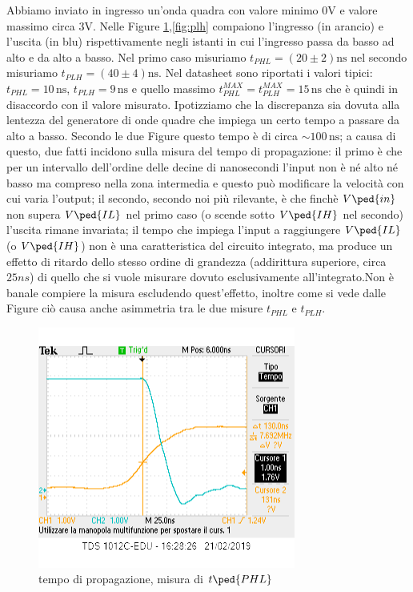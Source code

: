 \documentclass[10pt,a4paper]{article}
\begin{document}
Abbiamo inviato in ingresso un'onda quadra con valore minimo $0 \si{\volt}$  e valore massimo circa $3 \si{\volt}$. Nelle Figure \ref{fig:phl},\ref{fig:plh}  compaiono l'ingresso (in arancio) e l'uscita (in blu) rispettivamente negli istanti in cui l'ingresso passa da basso ad alto e da alto a basso.
Nel primo caso misuriamo $t_{PHL}= (20\pm 2 )\si{\nano\second}$ nel secondo  misuriamo $t_{PLH} = (40\pm 4)\si{\nano \second}$.
Nel datasheet sono riportati i valori tipici: $t_{PHL}= 10 \,\si{\nano\second}$, $t_{PLH} = 9\,\si{\nano \second}$ e quello massimo $t_{PHL}^{MAX}= t_{PLH}^{MAX}= 15\, \si{\nano\second}$ che è quindi in disaccordo con il valore misurato. Ipotizziamo  che la discrepanza sia dovuta alla lentezza del generatore di onde quadre che impiega un certo tempo a passare da alto a basso.
Secondo le due Figure questo tempo è di circa $\sim 100 \, \si {\nano\second}$; a causa di questo, due fatti incidono sulla misura del tempo di propagazione: il primo è che per un intervallo dell'ordine delle decine di nanosecondi l'input non è né alto né basso ma compreso nella zona intermedia e questo può modificare la velocità con cui varia l'output; il secondo, secondo noi più rilevante, è che finchè $V\ped{in}$ non supera $V\ped{IL}$ nel primo caso (o scende sotto $V\ped{IH}$ nel secondo) l'uscita rimane invariata; il  tempo che  impiega l'input a raggiungere $V\ped{IL}$ (o  $V\ped{IH}$) non è una caratteristica del circuito integrato, ma produce un effetto di ritardo dello stesso ordine di grandezza (addirittura superiore, circa $25ns$) di quello che si vuole misurare dovuto esclusivamente all'integrato.Non è banale  compiere la misura escludendo quest'effetto, inoltre come si vede dalle Figure ciò causa anche asimmetria tra le due misure  $t_{PHL}$ e  $t_{PLH}$.
\begin{figure}[h]
			\centering
			\includegraphics[scale=0.85]{schifo1}
			\caption{tempo di propagazione, misura di $t\ped{PHL}$}
			\label{fig:phl}
\end{figure}
\end{document}
